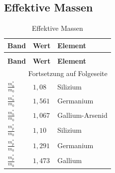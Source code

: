 \documentclass[12pt,a4paper]{report}%
\numberwithin{equation}{section}
\numberwithin{equation}{subsection}
\begin{document}
	\subsection{Effektive Massen} \label{ch:don/acc}
	\renewcommand{\arraystretch}{1.5}
	\begin{longtable} {|p{2cm}|p{3cm}|p{8.4cm}|} \hline
	\textbf{Band} & \textbf{Wert} & \textbf{Element} \\
	\hline
	\endfirsthead %
	\caption{Effektive Massen}\\ \hline
	\textbf{Band} & \textbf{Wert} & \textbf{Element} \\
	\hline
	\endhead %
	\multicolumn{3}{r}{Fortsetzung auf Folgeseite}\\
	\endfoot
	\hline
	\endlastfoot
	$\frac{m_n^*}{m_0}$ & $1,08$ & Silizium \\ \hline
	$\frac{m_n^*}{m_0}$ & $1,561$ & Germanium \\ \hline
	$\frac{m_n^*}{m_0}$ & $1,067$ & Gallium-Arsenid \\ \hline
	$\frac{m_p^*}{m_0}$ & $1,10$ & Silizium \\ \hline
	$\frac{m_p^*}{m_0}$ & $1,291$ & Germanium \\ \hline
	$\frac{m_p^*}{m_0}$ & $1,473$ & Gallium \\ \hline
	\end{longtable}
	\renewcommand{\arraystretch}{1}
	
\end{document}
